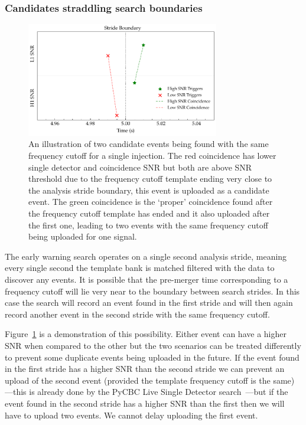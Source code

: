 \subsubsection{\label{6:sec:cands-across-bounds}Candidates straddling search boundaries}
%
\begin{figure}
       \centering
    \includegraphics[width=0.75\textwidth]{images/6_earlywarning/identified-problems/cands_across_bounds.pdf}
    \caption{An illustration of two candidate events being found with the same frequency cutoff for a single injection. The red coincidence has lower single detector and coincidence SNR but both are above SNR threshold due to the frequency cutoff template ending very close to the analysis stride boundary, this event is uploaded as a candidate event. The green coincidence is the `proper' coincidence found after the frequency cutoff template has ended and it also uploaded after the first one, leading to two events with the same frequency cutoff being uploaded for one \gwadj signal.}
    \label{6:fig:candidates_across_boundaries}
\end{figure}
%

The early warning search operates on a single second analysis stride, meaning every single second the template bank is matched filtered with the data to discover any \gwadj events. It is possible that the pre-merger time corresponding to a frequency cutoff will lie very near to the boundary between search strides. In this case the search will record an event found in the first stride and will then again record another event in the second stride with the same frequency cutoff.

Figure~\ref{6:fig:candidates_across_boundaries} is a demonstration of this possibility. Either event can have a higher SNR when compared to the other but the two scenarios can be treated differently to prevent some duplicate events being uploaded in the future. If the event found in the first stride has a higher SNR than the second stride we can prevent an upload of the second event (provided the template frequency cutoff is the same)---this is already done by the PyCBC Live Single Detector search~\cite{PyCBC_singles:2022}---but if the event found in the second stride has a higher SNR than the first then we will have to upload two events. We cannot delay uploading the first event.

